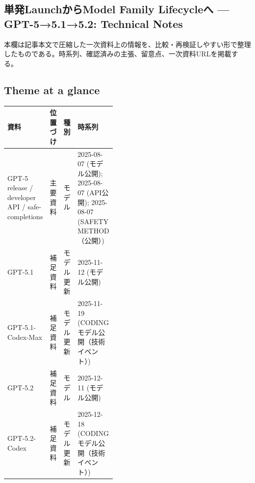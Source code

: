 \subsection*{単発LaunchからModel Family Lifecycleへ — GPT-5→5.1→5.2: Technical Notes}
本欄は記事本文で圧縮した一次資料上の情報を、比較・再検証しやすい形で整理したものである。時系列、確認済みの主張、留意点、一次資料URLを掲載する。
\medskip
\subsection*{Theme at a glance}
\begin{center}
\footnotesize
\begin{tabularx}{\linewidth}{@{}p{0.20\linewidth}p{0.10\linewidth}p{0.14\linewidth}X@{}}
\toprule
資料 & 位置づけ & 種別 & 時系列 \\
\midrule
GPT-5 release / developer API / safe-completions & 主要資料 & モデル & 2025-08-07 (モデル公開); 2025-08-07 (API公開); 2025-08-07 (SAFETY METHOD（公開）)  \\
GPT-5.1 & 補足資料 & モデル更新 & 2025-11-12 (モデル公開)  \\
GPT-5.1-Codex-Max & 補足資料 & モデル更新 & 2025-11-19 (CODING モデル公開（技術イベント）)  \\
GPT-5.2 & 補足資料 & モデル & 2025-12-11 (モデル公開)  \\
GPT-5.2-Codex & 補足資料 & モデル更新 & 2025-12-18 (CODING モデル公開（技術イベント）)  \\
\bottomrule
\end{tabularx}
\end{center}
\normalsize

